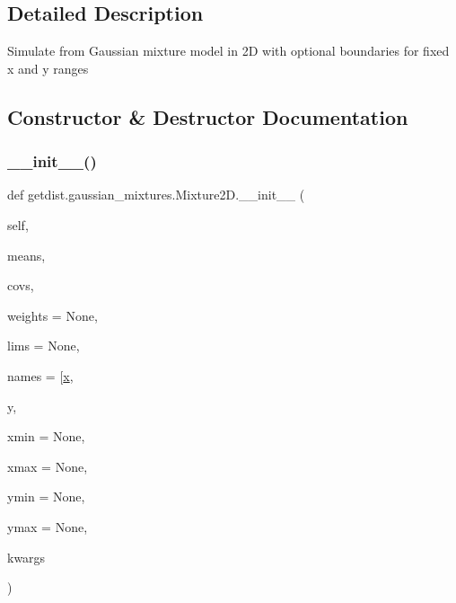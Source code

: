 \subsection{Detailed Description}
\begin{DoxyVerb}Simulate from Gaussian mixture model in 2D with optional boundaries for fixed x and y ranges
\end{DoxyVerb}
 

\subsection{Constructor \& Destructor Documentation}
\mbox{\label{classgetdist_1_1gaussian__mixtures_1_1Mixture2D_a5c0e8c7249a06e98e239a4340efedd19}} 
\subsubsection{\texorpdfstring{\+\_\+\+\_\+init\+\_\+\+\_\+()}{\_\_init\_\_()}}
{\footnotesize\ttfamily def getdist.\+gaussian\+\_\+mixtures.\+Mixture2\+D.\+\_\+\+\_\+init\+\_\+\+\_\+ (\begin{DoxyParamCaption}\item[{}]{self,  }\item[{}]{means,  }\item[{}]{covs,  }\item[{}]{weights = {\ttfamily None},  }\item[{}]{lims = {\ttfamily None},  }\item[{}]{names = {\ttfamily \mbox{[}\textquotesingle{}\mbox{\hyperlink{plotTT_8m_a9336ebf25087d91c818ee6e9ec29f8c1}{x}}\textquotesingle{}},  }\item[{}]{y,  }\item[{}]{xmin = {\ttfamily None},  }\item[{}]{xmax = {\ttfamily None},  }\item[{}]{ymin = {\ttfamily None},  }\item[{}]{ymax = {\ttfamily None},  }\item[{}]{kwargs }\end{DoxyParamCaption})}




